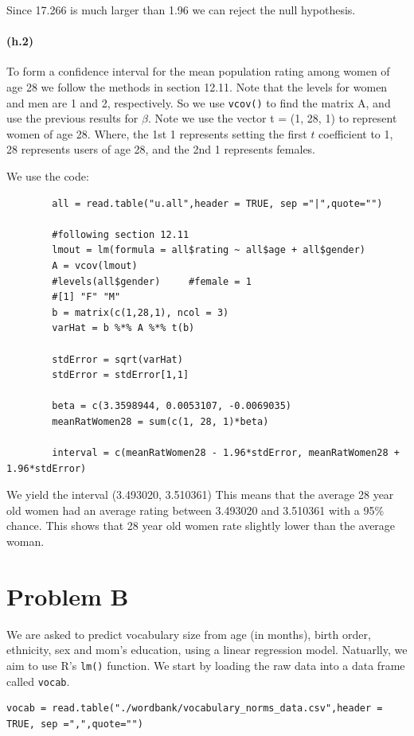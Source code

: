 \documentclass[fleqn]{article}
\begin{document}
		Since 17.266 is much larger than 1.96 we can reject the null hypothesis.

	\paragraph{(h.2)}
		To form a confidence interval for the mean population rating among women of age 28 we follow the methods in section 12.11.
		Note that the levels for women and men are 1 and 2, respectively. So we use \texttt{vcov()} to find the matrix A, and use the previous results for $\beta$.
		Note we use the vector t = (1, 28, 1) to represent women of age 28. Where, the 1st 1 represents setting the first $t$ coefficient to 1, 28 represents users of age 28, and the 2nd 1 represents females.

		We use the code:
		\begin{verbatim}
		all = read.table("u.all",header = TRUE, sep ="|",quote="")

		#following section 12.11
		lmout = lm(formula = all$rating ~ all$age + all$gender)
		A = vcov(lmout)
		#levels(all$gender) 	#female = 1
		#[1] "F" "M"
		b = matrix(c(1,28,1), ncol = 3)
		varHat = b %*% A %*% t(b)

		stdError = sqrt(varHat)
		stdError = stdError[1,1]

		beta = c(3.3598944, 0.0053107, -0.0069035)
		meanRatWomen28 = sum(c(1, 28, 1)*beta)

		interval = c(meanRatWomen28 - 1.96*stdError, meanRatWomen28 + 1.96*stdError)
		\end{verbatim}
		We yield the interval (3.493020, 3.510361)
		This means that the average 28 year old women had an average rating between 3.493020 and 3.510361 with a 95\% chance. This shows that 28 year old women rate slightly lower than the average woman.
		

\section*{Problem B}

	We are asked to predict vocabulary size from age (in months), birth order, ethnicity, sex and mom's education, using a linear regression model. Natuarlly, we aim to use R's \texttt{lm()} function.
	We start by loading the raw data into a data frame called \texttt{vocab}.

	\begin{verbatim}vocab = read.table("./wordbank/vocabulary_norms_data.csv",header = TRUE, sep =",",quote="")\end{verbatim}
\end{document}
